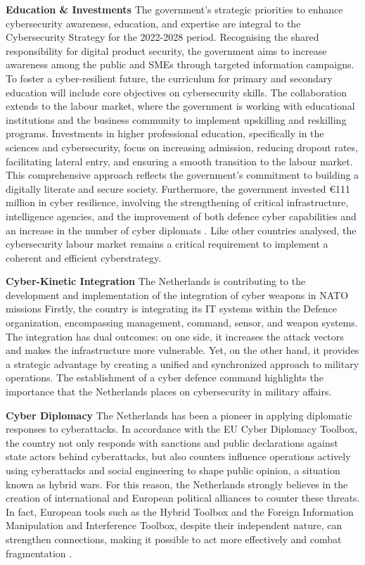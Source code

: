 \textbf{Education & Investments} The government's strategic priorities to enhance cybersecurity awareness, education, and expertise are integral to the Cybersecurity Strategy for the 2022-2028 period. Recognising the shared responsibility for digital product security, the government aims to increase awareness among the public and SMEs through targeted information campaigns. To foster a cyber-resilient future, the curriculum for primary and secondary education will include core objectives on cybersecurity skills. The collaboration extends to the labour market, where the government is working with educational institutions and the business community to implement upskilling and reskilling programs. Investments in higher professional education, specifically in the sciences and cybersecurity, focus on increasing admission, reducing dropout rates, facilitating lateral entry, and ensuring a smooth transition to the labour market. This comprehensive approach reflects the government's commitment to building a digitally literate and secure society. Furthermore, the government invested €111 million in cyber resilience, involving the strengthening of critical infrastructure, intelligence agencies, and the improvement of both defence cyber capabilities and an increase in the number of cyber diplomats \autocite{nationalgovernmentofthenetherlands_2023_internationale}. Like other countries analysed, the cybersecurity labour market remains a critical requirement to implement a coherent and efficient cyberstrategy.

\textbf{Cyber-Kinetic Integration} The Netherlands is contributing to the development and implementation of the integration of cyber weapons in NATO missions \autocite{ministryofdefence_2018_defence} Firstly, the country is integrating its IT systems within the Defence organization, encompassing management, command, sensor, and weapon systems. The integration has dual outcomes: on one side, it increases the attack vectors and makes the infrastructure more vulnerable. Yet, on the other hand, it provides a strategic advantage by creating a unified and synchronized approach to military operations. The establishment of a cyber defence command \autocite{theinternationalinstituteforstrategicstudies_2023_cyber} highlights the importance that the Netherlands places on cybersecurity in military affairs.  

\textbf{Cyber Diplomacy} The Netherlands has been a pioneer in applying diplomatic responses to cyberattacks. In accordance with the EU Cyber Diplomacy Toolbox, the country not only responds with sanctions and public declarations against state actors behind cyberattacks, but also counters influence operations actively using cyberattacks and social engineering to shape public opinion, a situation known as hybrid wars. For this reason, the Netherlands strongly believes in the creation of international and European political alliances to counter these threats. In fact, European tools such as the Hybrid Toolbox and the Foreign Information Manipulation and Interference Toolbox, despite their independent nature, can strengthen connections, making it possible to act more effectively and combat fragmentation \autocite{nationalgovernmentofthenetherlands_2023_internationale}.

